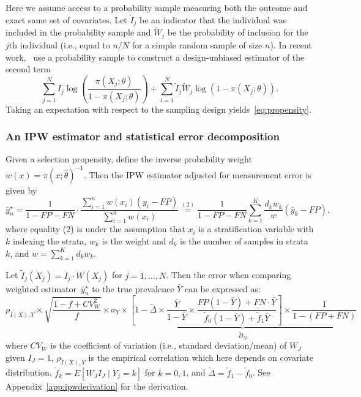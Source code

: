 \documentclass[11pt]{amsart}
\numberwithin{equation}{section}
\theoremstyle{plain}
\begin{document}
Here we assume access to a probability sample measuring both the outcome and exact same set of covariates.  Let $\tilde I_j$ be an indicator that the individual was included in the probability sample and $\tilde W_j$ be the probability of inclusion for the $j$th individual (i.e., equal to $n/N$ for a simple random sample of size $n$). In recent work,~\cite{Chen2019} use a probability sample to construct a design-unbiased estimator of the second term
\begin{equation}
\label{eq:auxinfoprob}
\sum_{j=1}^N I_j \log \left( \frac{\pi (X_j; \theta)}{1-\pi(X_j; \theta)} \right)  + \sum_{i=1}^N \tilde I_j \tilde W_j \log ( 1 - \pi (X_j; \theta)).
\end{equation}
Taking an expectation with respect to the sampling design yields~\eqref{eq:propensity}.



\subsubsection{An IPW estimator and statistical error decomposition}
\label{section:IPWerrordecomp}

Given a selection propensity, define the inverse probability weight~$w(x) = \pi (x; \hat \theta)^{-1}$. Then the IPW estimator adjusted for measurement error is given by
\begin{equation}
\label{eq:ipwest}
\bar y_n^\star
= \frac{1}{1-FP-FN} \cdot \frac{\sum_{i=1}^n w(x_i) (y_i - FP)}{\sum_{i=1}^n w (x_i)}
\stackrel{(2)}{=} \frac{1}{1-FP-FN} \sum_{k=1}^K \frac{d_k w_k}{w} (\bar y_k - FP),
\end{equation}
where equality (2) is under the assumption that $x_i$ is a stratification variable with $k$ indexing the strata, $w_k$ is the weight and $d_k$ is the number of samples in strata $k$, and $w = \sum_{k=1}^K d_k w_k$.

Let $\tilde I_j (X_j) = I_j  \cdot W(X_j)$ for $j=1,\ldots,N$.  Then the error when comparing weighted estimator~$\bar y_n^\star$ to the true prevalence $\bar Y$ can be expressed as:
\begin{equation}
\label{eq:statdecomp2}
\rho_{\tilde I (X), Y} \times \sqrt{\frac{1-f+ CV^2_W}{f}} \times \sigma_{Y} \times \underbrace{\left[ 1 - \tilde \Delta \times \frac{\bar Y}{1-\bar Y} \times \frac{FP(1-\bar Y) + FN \cdot \bar Y}{\tilde f_0 (1-\bar Y) + \tilde f_1 \bar Y} \right] \times \frac{1}{1-(FP+FN)}}_{\tilde D_M}
\end{equation}
where $CV_W$ is the coefficient of variation (i.e., standard deviation/mean) of $W_J$ given $I_J = 1$, $\rho_{\tilde I(X), Y}$ is the empirical correlation which here depends on covariate distribution, $\tilde f_k = E[ W_J I_J \mid Y_j = k]$ for $k=0,1$, and $\tilde \Delta = \tilde f_1 - \tilde f_0$.  See Appendix~\ref{app:ipwderivation} for the derivation.
\end{document}
